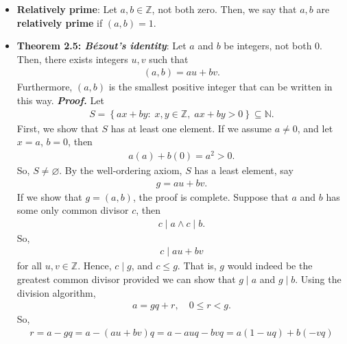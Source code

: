 \documentclass{report}
\begin{document}
\begin{itemize}
        \item \textbf{Relatively prime}: Let $a,b \in \mathbb{Z} $, not both zero. Then, we say that $a,b$ are \textbf{relatively prime} if $(a,b) =1$.
        \item \textbf{Theorem 2.5: \textit{B\'ezout's identity}}: Let $a$ and $b$ be integers, not both 0. Then, there exists integers $u,v$ such that 
            \begin{align*}
                (a,b) = au + bv
            .\end{align*}
            Furthermore, $(a,b)$ is the smallest positive integer that can be written in this way.
            \bigbreak \noindent 
            \textbf{\textit{Proof.}} Let
            \begin{align*}
                S = \left\{ax + by:\; x,y\in\mathbb{Z},\; ax + by > 0\right\} \subseteq \mathbb{N}
            .\end{align*}
            First, we show that $S$ has at least one element. If we assume $a\ne 0$, and let $x = a$, $b = 0$, then
            \begin{align*}
                a(a) + b(0) = a^{2} > 0
            .\end{align*}
            So, $S \ne \varnothing$. By the well-ordering axiom, $S$ has a least element, say
            \begin{align*}
                g = au + bv
            .\end{align*}
            If we show that $g = (a,b)$, the proof is complete.
            \bigbreak \noindent 
            Suppose that $a$ and $b$ has some only common divisor $c$, then
            \begin{align*}
                c \mid a \land c \mid b
            .\end{align*}
            So, 
            \begin{align*}
                c \mid au + bv
            \end{align*}
            for all $u,v \in \mathbb{Z}$. Hence, $c \mid g$, and $c \leq g$. That is, $g$ would indeed be the greatest common divisor provided we can show that $g \mid a$ and $g \mid b$.
            \bigbreak \noindent 
            Using the division algorithm, 
            \begin{align*}
                a = gq + r, \quad 0 \leq r < g
            .\end{align*}
            So,
            \begin{align*}
                r = a - gq = a - (au + bv)q = a - auq - bvq = a(1-uq) + b(-vq)

\end{align*}
\end{itemize}
\end{document}
